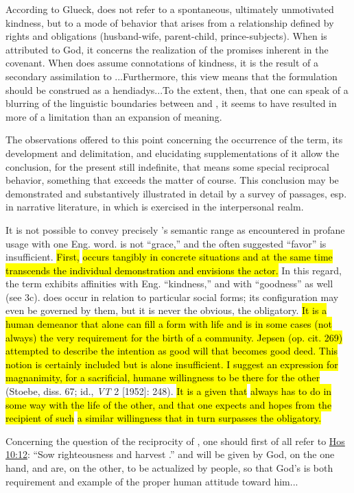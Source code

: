 \begin{compactdesc}
\begin{compactdesc}
							\item[PDF 598, 600] According to Glueck,  does not refer to a spontaneous, ultimately unmotivated kindness, but to a mode of behavior that arises from a relationship defined by rights and obligations (husband-wife, parent-child, prince-subjects). When  is attributed to God, it concerns the realization of the promises inherent in the covenant. When  does assume connotations of kindness, it is the result of a secondary assimilation to ...Furthermore, this view means that the formulation  should be construed as a hendiadys...To the extent, then, that one can speak of a blurring of the linguistic boundaries between  and , it seems to have resulted in more of a limitation than an expansion of meaning.
							\item[PDF 601] The observations offered to this point concerning the occurrence of the term, its development and delimitation, and elucidating supplementations of it allow the conclusion, for the present still indefinite, that  means some special reciprocal behavior, something that exceeds the matter of course. This conclusion may be demonstrated and substantively illustrated in detail by a survey of passages, esp. in narrative literature, in which  is exercised in the interpersonal realm.
							\item[PDF 604] It is not possible to convey precisely 's semantic range as encountered in profane usage with one Eng. word.  is not ``grace,'' and the often suggested ``favor'' is insufficient. \hl{First, } \hl{occurs tangibly in concrete situations and at the same time transcends the individual demonstration and envisions the actor.} In this regard, the term exhibits affinities with Eng. ``kindness,'' and with ``goodness'' as well (see 3c).  does occur in relation to particular social forms; its configuration may even be governed by them, but it is never the obvious, the obligatory. \hl{It is a human demeanor that alone can fill a form with life and is in some cases (not always) the very requirement for the birth of a community. Jepsen (op. cit. 269) attempted to describe the intention as good will that becomes good deed. This notion is certainly included but is alone insufficient. I suggest an expression for magnanimity, for a sacrificial, humane willingness to be there for the other} (Stoebe, diss. 67; id., \textit{VT} 2 [1952]: 248). \hl{It is a given that}  \hl{always has to do in some way with the life of the other, and that one expects and hopes from the recipient of such}  \hl{a similar willingness that in turn surpasses the obligatory.}
							\item[PDF 607--608] Concerning the question of the reciprocity of , one should first of all refer to \hyperref[HOSEA-10-12]{Hos 10:12}: ``Sow righteousness and harvest \he{.hEsEd}.''  and  will be given by God, on the one hand, and are, on the other, to be actualized by people, so that God's  is both requirement and example of the proper human attitude toward him...


\end{compactdesc}
\end{compactdesc}
